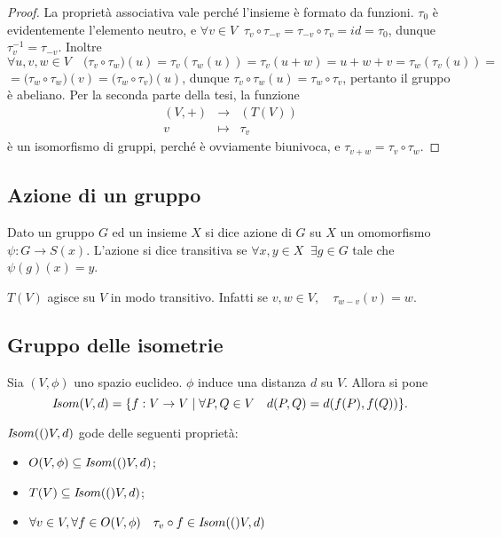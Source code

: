 \documentclass[a4paper,12pt]{article}
\newcommand{\Got}[1]{#1}
\newcommand{\got}[1]{{#1}}
\begin{document}
 \begin{proof}
\Got{La proprietà associativa vale perché l'insieme è formato da funzioni.}
 $\got{\tau_0}$ \Got{è evidentemente l'elemento neutro, e} $\got{\forall v\in V\;\; \tau_v}\circ\got{\tau_{-v}=\tau_{-v}}\circ\got{\tau_v=id=\tau_0}$, 
 \Got{dunque} $\got{\tau_v^{-1}=\tau_{-v}}$.
 \Got{Inoltre} $\got{\forall u,v,w\in V\quad (\tau_v}\circ\got{\tau_w)(u)=\tau_v(\tau_w(u))=\tau_v(u+w)=u+w+v=\tau_w(\tau_v(u))=}$\\
 $\got{=(\tau_w}\circ\got{\tau_w)(v)=(\tau_w}\circ\got{\tau_v)(u)}$, \Got{dunque } $\got{\tau_v}\circ\got{\tau_w(u)=\tau_w}\circ\got{\tau_v}$,
 \Got{ pertanto il gruppo è abeliano.
 Per la seconda parte della tesi, la funzione}
 \begin{eqnarray*}
	\got{(V,+)} & \to & \got{(T(V))} \\
	\got{v} & \mapsto & \got{\tau_v}
 \end{eqnarray*}
 \Got{è un isomorfismo di gruppi, perché è ovviamente biunivoca, e } $\got{\tau_{v+w}=\tau_v}\circ\got{\tau_w}$.
  \end{proof}
  
	\subsection{Azione di un gruppo}
 
 \Got{Dato un gruppo} $\got{G}$ \Got{ed un insieme} $\got{X}$ \Got{si dice azione di} $\got{G}$ \Got{su} $\got{X}$ \Got{un omomorfismo}
 $\psi:\got{G\to S(x)}$.
 \Got{L'azione si dice transitiva se } $\got{\forall x,y\in X\;\;\exists g\in G}$ \Got{tale che } $\got{\psi(g)(x)=y}$.
 
 \begin{remark}
 \Got{}$\got{T(V)}$ \Got{agisce su} $\got{V}$ \Got{in modo transitivo.
 Infatti se} $\got{v,w\in V,\quad\tau_{w-v}(v)=w}$.
 \end{remark}
 
	\subsection{Gruppo delle isometrie}
 
 \Got{Sia} $\got{(V,\phi)}$ \Got{uno spazio euclideo.} $\got{\phi}$ \Got{induce una distanza} $\got{d}$ \Got{su} $\got{V}$. \Got{Allora si pone}
 $$\got{\Isom{V,d}=\{f:V\to V\;|\;\forall P,Q\in V\quad d(P,Q)=d(f(P),f(Q))\}}.$$
 
 \begin{remark} $\got{\Isom(V,d)}$ \Got{gode delle seguenti proprietà:}
 \begin{itemize}
	\item $\got{O(V,\phi)\subseteq \Isom(V,d)}$;
	\item $\got{T(V)\subseteq \Isom(V,d)}$;
	\item $\got{\forall v\in V,\forall f\in O(V,\phi)\quad\tau_v}\circ\got{ f\in \Isom(V,d)}$
 \end{itemize}
 \end{remark}
 
\end{document}
